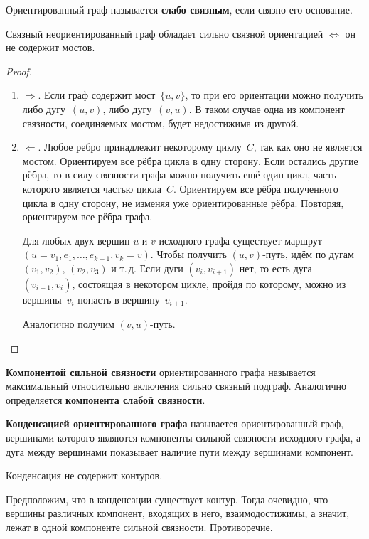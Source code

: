 Ориентированный граф называется \textbf{слабо связным}, если связно его основание.

\begin{theorem}
Связный неориентированный граф обладает сильно связной ориентацией $\Leftrightarrow$ он не содержит мостов.
\end{theorem}
\begin{proof}
\begin{enumerate}
	\item $\Rightarrow$. Если граф содержит мост~$\{ u, v \}$, то при его ориентации можно получить либо дугу~$(u, v)$, либо дугу~$(v, u)$.
	В таком случае одна из компонент связности, соединяемых мостом, будет недостижима из другой.
	
	\item $\Leftarrow$. Любое ребро принадлежит некоторому циклу~$C$, так как оно не является мостом.
	Ориентируем все рёбра цикла в одну сторону.
	Если остались другие рёбра, то в силу связности графа можно получить ещё один цикл, часть которого является частью цикла~$C$.
	Ориентируем все рёбра полученного цикла в одну сторону, не изменяя уже ориентированные рёбра.
	Повторяя, ориентируем все рёбра графа.
	
	Для любых двух вершин $u$ и $v$ исходного графа существует маршрут $(u = v_1, e_1, \ldots, e_{k-1}, v_k = v)$.
	Чтобы получить $(u, v)$-путь, идём по дугам $(v_1, v_2)$, $(v_2, v_3)$ и т.\,д.
	Если дуги $(v_i, v_{i+1})$ нет, то есть дуга $(v_{i+1}, v_i)$, состоящая в некотором цикле, пройдя по которому, можно из вершины~$v_i$ попасть в вершину~$v_{i+1}$.
	
	Аналогично получим $(v, u)$-путь.
\end{enumerate}
\end{proof}

 \textbf{Компонентой сильной связности} ориентированного графа называется максимальный относительно включения сильно связный подграф.
Аналогично определяется \textbf{компонента слабой связности}.

\textbf{Конденсацией ориентированного графа} называется ориентированный граф, вершинами которого являются компоненты сильной связности исходного графа, а дуга между вершинами показывает наличие пути между вершинами компонент.

\begin{statement}
Конденсация не содержит контуров.
\end{statement}
\begin{proofcontra}
Предположим, что в конденсации существует контур.
Тогда очевидно, что вершины различных компонент, входящих в него, взаимодостижимы, а значит, лежат в одной компоненте сильной связности.
Противоречие.
\end{proofcontra}

